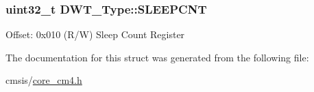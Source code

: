 \subsubsection[{\texorpdfstring{S\+L\+E\+E\+P\+C\+NT}{SLEEPCNT}}]{ uint32\+\_\+t D\+W\+T\+\_\+\+Type\+::\+S\+L\+E\+E\+P\+C\+NT}\hypertarget{struct_d_w_t___type_a8afd5a4bf994011748bc012fa442c74d}{}\label{struct_d_w_t___type_a8afd5a4bf994011748bc012fa442c74d}
Offset\+: 0x010 (R/W) Sleep Count Register 

The documentation for this struct was generated from the following file\+:\begin{DoxyCompactItemize}
\item 
cmsis/\hyperlink{core__cm4_8h}{core\+\_\+cm4.\+h}\end{DoxyCompactItemize}
